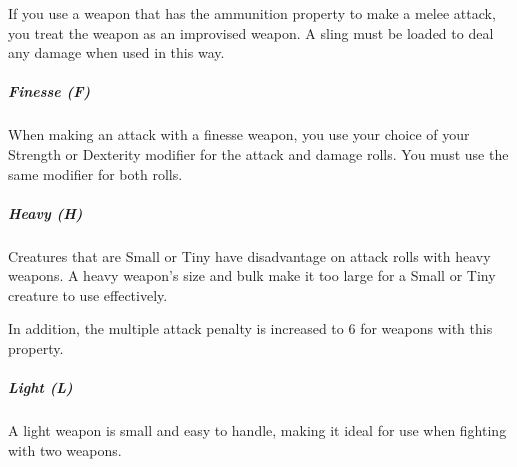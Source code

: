         If you use a weapon that has the ammunition property to make a melee attack, you treat the weapon as an improvised weapon.
        A sling must be loaded to deal any damage when used in this way.
    \subparagraph{Finesse (F)}
        When making an attack with a finesse weapon, you use your choice of your Strength or Dexterity modifier for the attack and damage rolls.
        You must use the same modifier for both rolls.
    \subparagraph{Heavy (H)}
        Creatures that are Small or Tiny have disadvantage on attack rolls with heavy weapons.
        A heavy weapon's size and bulk make it too large for a Small or Tiny creature to use effectively.

        In addition, the multiple attack penalty is increased to 6 for weapons with this property.
    \subparagraph{Light (L)}
        A light weapon is small and easy to handle, making it ideal for use when fighting with two weapons.

